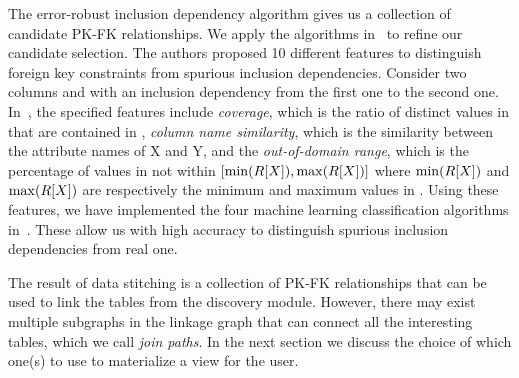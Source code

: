 The error-robust inclusion dependency algorithm gives us a collection of candidate PK-FK relationships. 
We apply the algorithms in~\cite{DBLP:conf/webdb/RostinABNL09} to refine our candidate selection. The authors proposed 10 different features to distinguish foreign key constraints from spurious inclusion dependencies. Consider two columns \RX and \SY with an inclusion dependency from the first one to the second one. In~\cite{DBLP:conf/webdb/RostinABNL09}, the specified features include \emph{coverage}, which is the ratio of distinct values in \RX that are contained in \SY, \emph{column name similarity}, which is the similarity between the attribute names of X and Y, and the \emph{out-of-domain range}, which is the percentage of values in \SY not within $[\min(R[X]), \max(R[X])]$ where $\min(R[X])$ and $\max(R[X])$ are respectively the minimum and maximum values in \RX. 
Using these features, we have implemented the four machine learning classification algorithms in~\cite{DBLP:conf/webdb/RostinABNL09}. These allow us with high accuracy to distinguish spurious inclusion dependencies from real one.

The result of data stitching is a collection of PK-FK relationships that can be used to link the tables from the discovery module. However, there may exist multiple subgraphs in the linkage graph that can connect all the interesting tables, which we call \emph{join paths}. In the next section we discuss the choice of which one(s) to use to materialize a view for the user.


